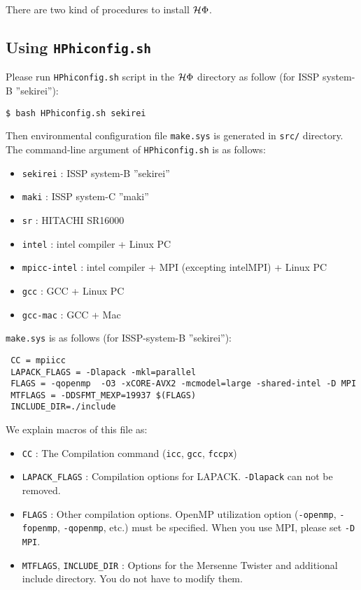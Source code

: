 There are two kind of procedures to install $\mathcal{H} \Phi$.

\subsection{Using \texttt{HPhiconfig.sh}}

Please run \verb|HPhiconfig.sh| script in the $\mathcal{H} \Phi$ directory as follow
(for ISSP system-B ''sekirei''):
\begin{verbatim}
$ bash HPhiconfig.sh sekirei
\end{verbatim}
Then environmental configuration file \verb|make.sys| is generated in 
\verb|src/| directory.
The command-line argument of \verb|HPhiconfig.sh| is as follows:
\begin{itemize}
\item \verb|sekirei| : ISSP system-B ''sekirei''
\item \verb|maki| : ISSP system-C ''maki''
\item \verb|sr| : HITACHI SR16000
\item \verb|intel| : intel compiler + Linux PC
\item \verb|mpicc-intel| : intel compiler + MPI (excepting intelMPI) + Linux PC
\item \verb|gcc| : GCC + Linux PC
\item \verb|gcc-mac| : GCC + Mac
\end{itemize}

\verb|make.sys| is as follows (for ISSP-system-B ''sekirei''):
\begin{verbatim}
 CC = mpiicc
 LAPACK_FLAGS = -Dlapack -mkl=parallel 
 FLAGS = -qopenmp  -O3 -xCORE-AVX2 -mcmodel=large -shared-intel -D MPI
 MTFLAGS = -DDSFMT_MEXP=19937 $(FLAGS)
 INCLUDE_DIR=./include
\end{verbatim}
We explain macros of this file as: 
\begin{itemize}
\item \verb|CC| : The Compilation command (\verb|icc|, \verb|gcc|, \verb|fccpx|)
\item \verb|LAPACK_FLAGS| : Compilation options for LAPACK. \verb|-Dlapack| can not be removed.
\item \verb|FLAGS| : Other compilation options.
  OpenMP utilization option (\verb|-openmp|, \verb|-fopenmp|, \verb|-qopenmp|, etc.)
  must be specified.
  When you use MPI, please set \verb|-D MPI|.
\item \verb|MTFLAGS|, \verb|INCLUDE_DIR| : Options for the Mersenne Twister
  and additional include directory. You do not have to modify them.
\end{itemize}


